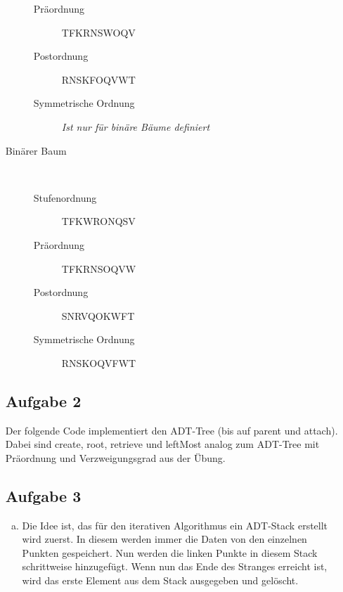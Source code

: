 \documentclass[11pt]{article}
\begin{document}
\begin{enumerate}[a)]
\begin{description}
\begin{description}
          \item[Präordnung]
            TFKRNSWOQV

          \item[Postordnung]
            RNSKFOQVWT

          \item[Symmetrische Ordnung]
            \emph{Ist nur für binäre Bäume definiert}

        \end{description}

      \item[Binärer Baum] $ $
        \begin{description}

          \item[Stufenordnung] 
            TFKWRONQSV

          \item[Präordnung]
            TFKRNSOQVW

          \item[Postordnung]
            SNRVQOKWFT

          \item[Symmetrische Ordnung]
            RNSKOQVFWT

        \end{description}
    \end{description}
    
    \subsection*{Aufgabe 2}
      Der folgende Code implementiert den ADT-Tree (bis auf parent und attach).
      Dabei sind create, root, retrieve und leftMost analog zum ADT-Tree mit
      Präordnung und Verzweigungsgrad aus der Übung.
      
      
    
    \subsection*{Aufgabe 3}
    \begin{enumerate}[a.)]
    	
      \item
      Die Idee ist, das für den iterativen Algorithmus ein ADT-Stack erstellt
      wird zuerst. In diesem werden immer die Daten von den einzelnen Punkten
      gespeichert. Nun werden die linken Punkte in diesem Stack schrittweise 
      hinzugefügt. Wenn nun das Ende des Stranges erreicht ist, wird das 
      erste Element aus dem Stack ausgegeben und gelöscht.
      

\end{enumerate}
\end{enumerate}
\end{document}
